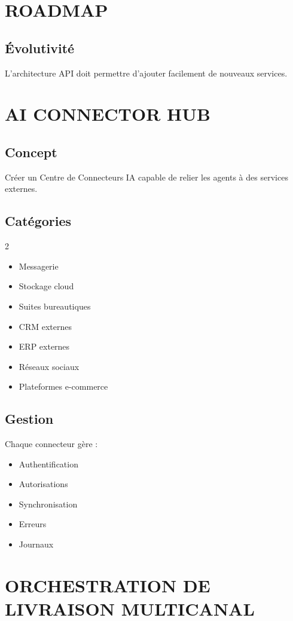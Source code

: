 \documentclass[12pt,a4paper,oneside]{book}
\begin{document}
\chapter{ROADMAP}

\section{Évolutivité}
L'architecture API doit permettre d'ajouter facilement de nouveaux services.

\chapter{AI CONNECTOR HUB}

\section{Concept}
Créer un Centre de Connecteurs IA capable de relier les agents à des services externes.

\section{Catégories}
\begin{multicols}{2}
\begin{itemize}
\item Messagerie
\item Stockage cloud
\item Suites bureautiques
\item CRM externes
\item ERP externes
\item Réseaux sociaux
\item Plateformes e-commerce
\end{itemize}
\end{multicols}

\section{Gestion}
Chaque connecteur gère :
\begin{itemize}
\item Authentification
\item Autorisations
\item Synchronisation
\item Erreurs
\item Journaux
\end{itemize}

\chapter{ORCHESTRATION DE LIVRAISON MULTICANAL}
\end{document}

